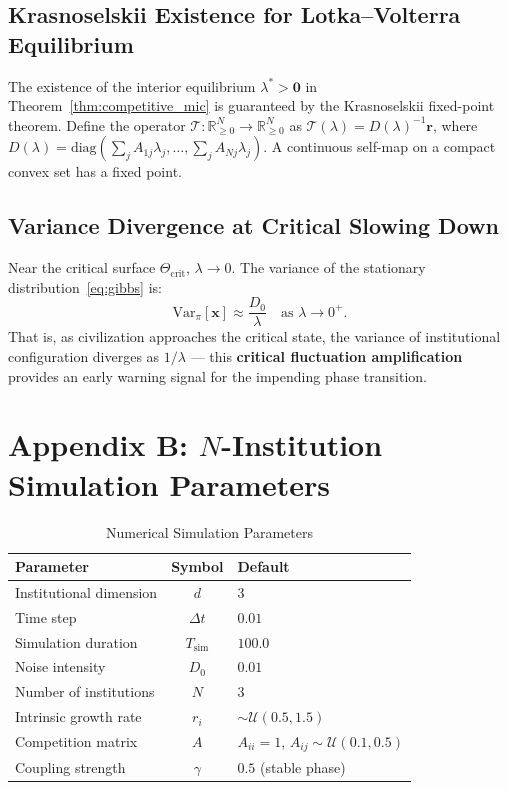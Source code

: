\documentclass[12pt,a4paper]{article}
\theoremstyle{definition}
\newcommand{\R}{\mathbb{R}}
\newcommand{\Var}{\text{Var}}
\newcommand{\lb}{\lambda}
\newcommand{\diag}{\mathrm{diag}}
\begin{document}
\subsection{Krasnoselskii Existence for Lotka--Volterra Equilibrium}
\label{app:krasnoselskii}

The existence of the interior equilibrium $\lb^* > \mathbf{0}$ in Theorem~\ref{thm:competitive_mic} is guaranteed by the Krasnoselskii fixed-point theorem. Define the operator $\mathcal{T}: \R_{\geq 0}^N \to \R_{\geq 0}^N$ as $\mathcal{T}(\lb) = D(\lb)^{-1} \mathbf{r}$, where $D(\lb) = \diag(\sum_j A_{1j}\lb_j, \ldots, \sum_j A_{Nj}\lb_j)$. A continuous self-map on a compact convex set has a fixed point.

\subsection{Variance Divergence at Critical Slowing Down}
\label{app:critical_slowing}

Near the critical surface $\Theta_{\text{crit}}$, $\lb \to 0$. The variance of the stationary distribution~\eqref{eq:gibbs} is:
\begin{equation}\label{eq:variance_div}
    \Var_{\pi}[\mathbf{x}] \approx \frac{D_0}{\lb} \quad \text{as } \lb \to 0^+.
\end{equation}
That is, as civilization approaches the critical state, the variance of institutional configuration diverges as $1/\lb$ --- this \textbf{critical fluctuation amplification} provides an early warning signal for the impending phase transition.

\section{Appendix B: $N$-Institution Simulation Parameters}
\label{app:params}

\begin{table}[htbp]
\centering
\caption{Numerical Simulation Parameters}
\label{tab:params}
\begin{tabular}{@{}lcl@{}}
\toprule
\textbf{Parameter} & \textbf{Symbol} & \textbf{Default} \\
\midrule
Institutional dimension & $d$ & 3 \\
Time step & $\Delta t$ & $0.01$ \\
Simulation duration & $T_{\text{sim}}$ & $100.0$ \\
Noise intensity & $D_0$ & $0.01$ \\
Number of institutions & $N$ & 3 \\
Intrinsic growth rate & $r_i$ & $\sim \mathcal{U}(0.5, 1.5)$ \\
Competition matrix & $A$ & $A_{ii}=1$, $A_{ij} \sim \mathcal{U}(0.1, 0.5)$ \\
Coupling strength & $\gamma$ & $0.5$ (stable phase) \\
\bottomrule
\end{tabular}
\end{table}
\end{document}
